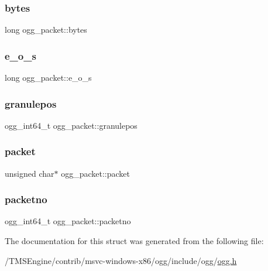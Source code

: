 \subsubsection{\texorpdfstring{bytes}{bytes}}
{\footnotesize\ttfamily long ogg\+\_\+packet\+::bytes}

\mbox{\label{structogg__packet_aa367e7c5425c5f65cbd126b82dfc72e8}} 
\subsubsection{\texorpdfstring{e\+\_\+o\+\_\+s}{e\_o\_s}}
{\footnotesize\ttfamily long ogg\+\_\+packet\+::e\+\_\+o\+\_\+s}

\mbox{\label{structogg__packet_a838d9a000e08bae982409bc2734fc566}} 
\subsubsection{\texorpdfstring{granulepos}{granulepos}}
{\footnotesize\ttfamily ogg\+\_\+int64\+\_\+t ogg\+\_\+packet\+::granulepos}

\mbox{\label{structogg__packet_a57e7096985ec8766dce415e248767c32}} 
\subsubsection{\texorpdfstring{packet}{packet}}
{\footnotesize\ttfamily unsigned char$\ast$ ogg\+\_\+packet\+::packet}

\mbox{\label{structogg__packet_a60e257b3a8f843135474457197c65a45}} 
\subsubsection{\texorpdfstring{packetno}{packetno}}
{\footnotesize\ttfamily ogg\+\_\+int64\+\_\+t ogg\+\_\+packet\+::packetno}



The documentation for this struct was generated from the following file\+:\begin{DoxyCompactItemize}
\item 
/\+T\+M\+S\+Engine/contrib/msvc-\/windows-\/x86/ogg/include/ogg/\hyperlink{ogg_8h}{ogg.\+h}\end{DoxyCompactItemize}
